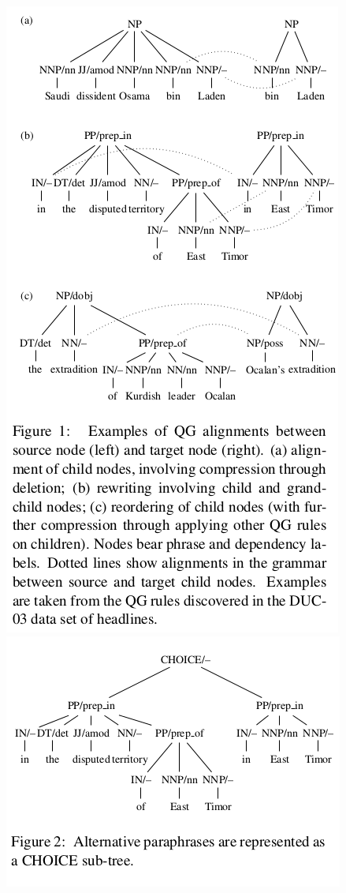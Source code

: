 \documentclass[xcolor={table}]{beamer}
\begin{document}
\begin{frame}[t]{\cite{woodsend2010generation}}
      \begin{figure}[h]
          \centering
      \includegraphics[scale=.25]{images/figure1-woodsend10} 
      \includegraphics[scale=.25]{images/figure2-woodsend10} 
  \end{figure}
\end{frame}
\end{document}

